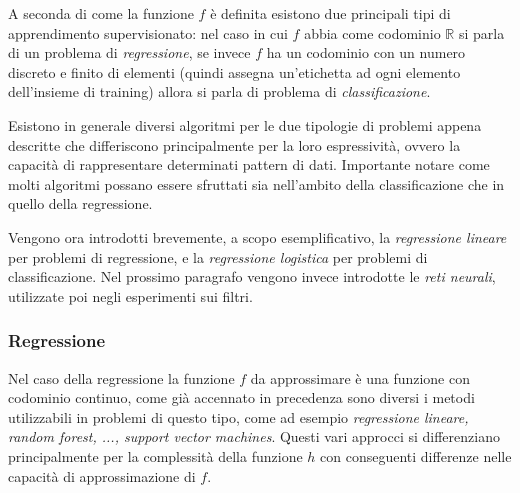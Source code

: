 \documentclass[../../main.tex]{subfiles}
\begin{document}
    A seconda di come la funzione $f$ è definita esistono due principali tipi di apprendimento supervisionato: nel caso in cui $f$ abbia come codominio $\mathbb{R}$ si parla di un problema di \textit{regressione}, se invece $f$ ha un codominio con un numero discreto e finito di elementi (quindi assegna un'etichetta ad ogni elemento dell'insieme di training) allora si parla di problema di \textit{classificazione}.

    Esistono in generale diversi algoritmi per le due tipologie di problemi appena descritte che differiscono principalmente per la loro espressività, ovvero la capacità di rappresentare determinati pattern di dati. Importante notare come molti algoritmi possano essere sfruttati sia nell'ambito della classificazione che in quello della regressione.

    Vengono ora introdotti brevemente, a scopo esemplificativo, la \textit{regressione lineare} per problemi di regressione, e la \textit{regressione logistica} per problemi di classificazione. Nel prossimo paragrafo vengono invece introdotte le \textit{reti neurali}, utilizzate poi negli esperimenti sui filtri.

    \subsubsection{Regressione}

    Nel caso della regressione la funzione $f$ da approssimare è una funzione con codominio continuo, come già accennato in precedenza sono diversi i metodi utilizzabili in problemi di questo tipo, come ad esempio \textit{regressione lineare, random forest, ..., support vector machines}. Questi vari approcci si differenziano principalmente per la complessità della funzione $h$ con conseguenti differenze nelle capacità di approssimazione di $f$.
\end{document}
